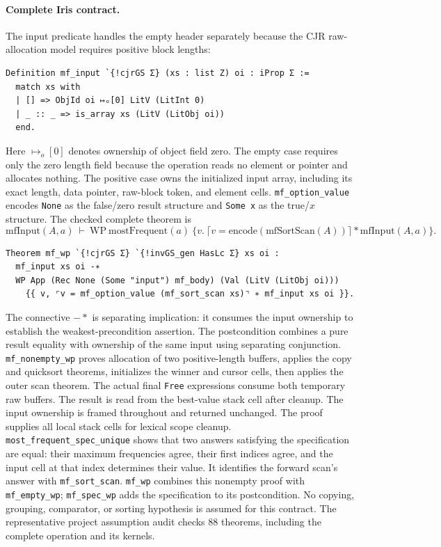 \paragraph{Complete Iris contract.}
The input predicate handles the empty header separately because the
CJR raw-allocation model requires positive block lengths:
\begin{lstlisting}
Definition mf_input `{!cjrGS Σ} (xs : list Z) oi : iProp Σ :=
  match xs with
  | [] => ObjId oi ↦ₒ[0] LitV (LitInt 0)
  | _ :: _ => is_array xs (LitV (LitObj oi))
  end.
\end{lstlisting}
Here $\mapsto_o[0]$ denotes ownership of object field zero. The empty case requires only the zero length field because the
operation reads no element or pointer and allocates nothing.
The positive case owns the initialized input array, including its exact
length, data pointer, raw-block token, and element cells.
\texttt{mf\_option\_value} encodes \texttt{None} as the false/zero result
structure and \texttt{Some x} as the true/$x$ structure.
The checked complete theorem is
\[
 \mathrm{mfInput}(A,a)\ \vdash\
 \mathrm{WP}\ \mathrm{mostFrequent}(a)\
 \{v.\ \lceil v=\mathrm{encode}(\mathrm{mfSortScan}(A))\rceil
       *\mathrm{mfInput}(A,a)\}.
\]
\par\noindent
\begin{minipage}{\textwidth}
\begin{lstlisting}
Theorem mf_wp `{!cjrGS Σ} `{!invGS_gen HasLc Σ} xs oi :
  mf_input xs oi -∗
  WP App (Rec None (Some "input") mf_body) (Val (LitV (LitObj oi)))
    {{ v, ⌜v = mf_option_value (mf_sort_scan xs)⌝ ∗ mf_input xs oi }}.
\end{lstlisting}
\end{minipage}\par
The connective $-\!* $ is separating implication: it consumes the
input ownership to establish the weakest-precondition assertion. The
postcondition combines a pure result equality with ownership of the same
input using separating conjunction.
\texttt{mf\_nonempty\_wp} proves allocation of two positive-length
buffers, applies the copy and quicksort theorems, initializes the winner
and cursor cells, then applies the outer scan theorem. The actual final
\texttt{Free} expressions consume both temporary raw buffers. The result
is read from the best-value stack cell after cleanup. The input ownership
is framed throughout and returned unchanged. The proof supplies all local
stack cells for lexical scope cleanup.
\texttt{most\_frequent\_spec\_unique} shows that two answers satisfying
the specification are equal: their maximum frequencies agree, their first
indices agree, and the input cell at that index determines their value.
It identifies the forward scan's answer with \texttt{mf\_sort\_scan}.
\texttt{mf\_wp} combines this nonempty proof with \texttt{mf\_empty\_wp};
\texttt{mf\_spec\_wp} adds the specification to its postcondition.
No copying, grouping, comparator, or sorting hypothesis is assumed for
this contract. The representative project assumption audit checks
88 theorems, including the complete operation and its kernels.

